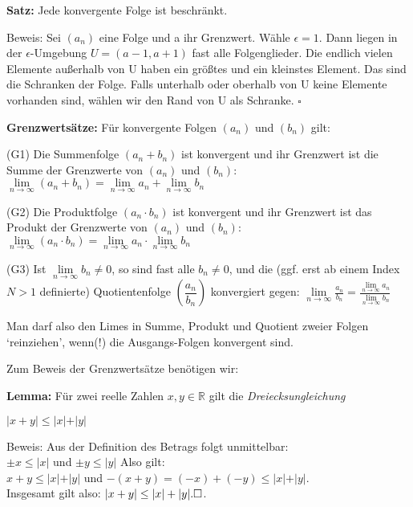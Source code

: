\begin{frame}[fragile]
\textbf{Satz:} Jede konvergente Folge ist beschränkt. \pause

Beweis: Sei $(a_n)$ eine Folge und a ihr Grenzwert. \pause  Wähle $\epsilon = 1$. Dann liegen in der $\epsilon$-Umgebung
$U = (a-1, a+1)$ fast alle Folgenglieder. \pause Die endlich vielen Elemente außerhalb von U haben ein größtes und ein 
kleinstes Element. \pause Das sind die Schranken der Folge. \pause Falls unterhalb oder oberhalb von U keine Elemente vorhanden sind, wählen wir den Rand von U als Schranke. \hfill $\square$
\end{frame}

\begin{frame}[fragile]

\textbf{Grenzwertsätze:}
Für konvergente Folgen $(a_n)$ und $(b_n)$ gilt: 

(G1) Die Summenfolge $(a_n + b_n)$ ist konvergent und ihr Grenzwert ist die Summe der Grenzwerte von
$(a_n)$ und $(b_n)$: \\
$\lim \limits_{n \to \infty} (a_n + b_n)= \lim \limits_{n \to \infty} a_n + \lim \limits_{n \to \infty} b_n$ \pause

(G2) Die Produktfolge $(a_n \cdot b_n)$ ist konvergent und ihr Grenzwert ist das Produkt der Grenzwerte von
$(a_n)$ und $(b_n)$: \\
$\lim \limits_{n \to \infty} (a_n  \cdot b_n)= \lim \limits_{n \to \infty} a_n \cdot \lim \limits_{n \to \infty} b_n$ \pause
 
 (G3) Ist  $\lim \limits_{n \to \infty} b_n \ne 0$, so sind fast alle $b_n \ne 0$, und die (ggf. erst ab einem Index $N>1$ definierte) Quotientenfolge $(\dfrac{a_n}{b_n})$ konvergiert gegen:
 $\lim \limits_{n \to \infty} \frac{a_n}{b_n}=  \frac{\lim \limits_{n \to \infty} a_n }{\lim \limits_{n \to \infty} b_n}$ \pause
 
 Man darf also den Limes in Summe, Produkt und Quotient zweier Folgen `reinziehen',
wenn(!) die Ausgangs-Folgen konvergent sind.
\end{frame}


\begin{frame}[fragile]

Zum Beweis der Grenzwertsätze benötigen wir:

\textbf{Lemma:}
Für zwei reelle Zahlen $x, y \in \mathbb{R}$ gilt die \textit{Dreiecksungleichung}

$\vert x+y \vert \le \vert x \vert + \vert y \vert$ \pause

Beweis: Aus der Definition des Betrags folgt unmittelbar: \\
 $\pm x \le \vert x \vert$ und  $\pm y \le \vert y \vert$ \pause  Also gilt: \\
$x+y \le \vert x \vert + \vert y \vert$ \pause und $-(x+y) = (-x)+(-y) \le  \vert x \vert + \vert y \vert$.  \\ \pause
Insgesamt gilt also: $\vert x + y \vert \le \vert x \vert + \vert y \vert. \hfill \square$. 

\end{frame}


